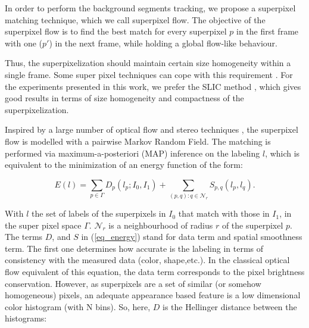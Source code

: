 \label{sec:suppix}

In order to perform the background segments tracking,  we propose a superpixel matching technique, 
which we call superpixel flow. The objective of the superpixel flow is to find the best match for every superpixel $p$ in the first 
frame with one ($p'$) in the next frame, while holding a global flow-like behaviour.

Thus, the superpixelization should maintain certain size homogeneity within a single frame. Some super
pixel techniques can cope with this requirement \cite{c9,c10}. For the experiments presented 
in this work, we prefer the SLIC method \cite{c9}, which gives
good results in terms of size homogeneity and compactness of the superpixelization. 


Inspired by a large number of optical flow and stereo techniques \cite{c7,c12,c13}, 
the superpixel flow is modelled with a pairwise Markov Random Field. The matching is performed via maximum-a-posteriori (MAP) inference on the labeling $l$, which is equivalent to the minimization of an energy function of the form:

\begin{equation}
E(l) = \displaystyle \sum_{p \in \Gamma} D_p(l_p;I_0,I_1) +
\sum_{(p,q): q \in \mathcal{N}_r} S_{p,q}(l_p,l_q) .
\label{eq_energy}
\end{equation}

With $l$ the set of labels of the superpixels in $I_0$
that match with those in $I_1$, in the super pixel space $\Gamma$. $\mathcal{N}_r$ is a neighbourhood of radius $r$ of the superpixel $p$.
The terms $D$, and $S$ in (\ref{eq_energy}) stand for data term and spatial smoothness term. 
The first one determines how accurate is the labeling in terms
of consistency with the measured data (color, shape,etc.). In the classical optical flow equivalent of this equation,
the data term corresponds to the pixel brightness conservation\cite{c5,c7}. However, as superpixels are a set
of similar (or somehow homogeneous) pixels, an adequate appearance based feature is a low dimensional
color histogram (with N bins). So, here, $D$ is the Hellinger distance between the histograms:

